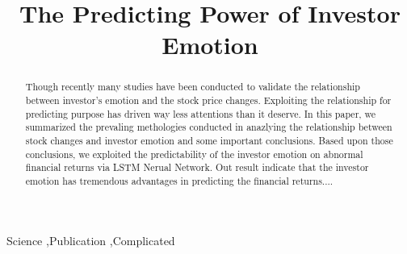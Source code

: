 \documentclass[preprint,12pt]{elsarticle}
\begin{document}
\begin{frontmatter}


\title{The Predicting Power of Investor Emotion}





\address{California, United States}

\begin{abstract}
Though recently many studies have been conducted to validate the relationship between investor's emotion and the stock price changes. Exploiting the relationship for predicting purpose has driven way less attentions than it deserve. In this paper, we summarized the prevaling methologies conducted in anazlying the relationship between stock changes and investor emotion and some important conclusions. Based upon those conclusions, we exploited the predictability of the investor emotion on abnormal financial returns via LSTM Nerual Network. Out result indicate that the investor emotion has tremendous advantages in predicting the financial returns....
\end{abstract}

\begin{keyword}
Science \sep Publication \sep Complicated


\end{keyword}

\end{frontmatter}
\end{document}
